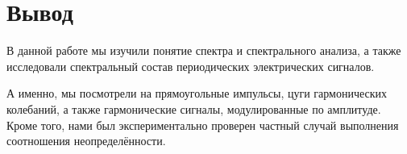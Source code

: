 \documentclass[a4paper,12pt]{article}
\begin{document}
\newpage


\section*{Вывод}
В данной работе мы изучили понятие спектра и спектрального анализа, а также исследовали спектральный состав периодических электрических сигналов.

А именно, мы посмотрели на прямоугольные импульсы, цуги гармонических колебаний, а также гармонические сигналы, модулированные по амплитуде. Кроме того, нами был экспериментально проверен частный случай выполнения соотношения неопределённости.
\end{document}
